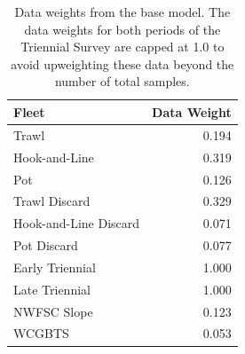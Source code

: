 \documentclass[
  english,
]{article}
\begin{document}
\begin{longtable}{lr}

\caption{\label{tbl-data-weights}Data weights from the base model. The
data weights for both periods of the Triennial Survey are capped at 1.0
to avoid upweighting these data beyond the number of total samples.}

\tabularnewline

\toprule
Fleet & Data Weight \\ 
\midrule\addlinespace[2.5pt]
Trawl & 0.194 \\ 
Hook-and-Line & 0.319 \\ 
Pot & 0.126 \\ 
Trawl Discard & 0.329 \\ 
Hook-and-Line Discard & 0.071 \\ 
Pot Discard & 0.077 \\ 
Early Triennial & 1.000 \\ 
Late Triennial & 1.000 \\ 
NWFSC Slope & 0.123 \\ 
WCGBTS & 0.053 \\ 
\bottomrule

\end{longtable}

\endgroup

\newpage{}
\end{document}
